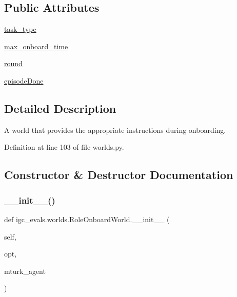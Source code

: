 \subsection*{Public Attributes}
\begin{DoxyCompactItemize}
\item 
\hyperlink{classigc__evals_1_1worlds_1_1RoleOnboardWorld_aa4474e6170fb62445d09455a09377b1c}{task\+\_\+type}
\item 
\hyperlink{classigc__evals_1_1worlds_1_1RoleOnboardWorld_ac1d2cbbaa66cf111ba39cbd112448b99}{max\+\_\+onboard\+\_\+time}
\item 
\hyperlink{classigc__evals_1_1worlds_1_1RoleOnboardWorld_ae6b8b37395e2430f1d533b6fc4cee64e}{round}
\item 
\hyperlink{classigc__evals_1_1worlds_1_1RoleOnboardWorld_a5746dc1a7d35c4a525c8fd2f5f20e149}{episode\+Done}
\end{DoxyCompactItemize}


\subsection{Detailed Description}
\begin{DoxyVerb}A world that provides the appropriate instructions during onboarding.
\end{DoxyVerb}
 

Definition at line 103 of file worlds.\+py.



\subsection{Constructor \& Destructor Documentation}
\mbox{\label{classigc__evals_1_1worlds_1_1RoleOnboardWorld_a7842fc40e237a810c8e281c63b176324}} 
\subsubsection{\texorpdfstring{\+\_\+\+\_\+init\+\_\+\+\_\+()}{\_\_init\_\_()}}
{\footnotesize\ttfamily def igc\+\_\+evals.\+worlds.\+Role\+Onboard\+World.\+\_\+\+\_\+init\+\_\+\+\_\+ (\begin{DoxyParamCaption}\item[{}]{self,  }\item[{}]{opt,  }\item[{}]{mturk\+\_\+agent }\end{DoxyParamCaption})}



